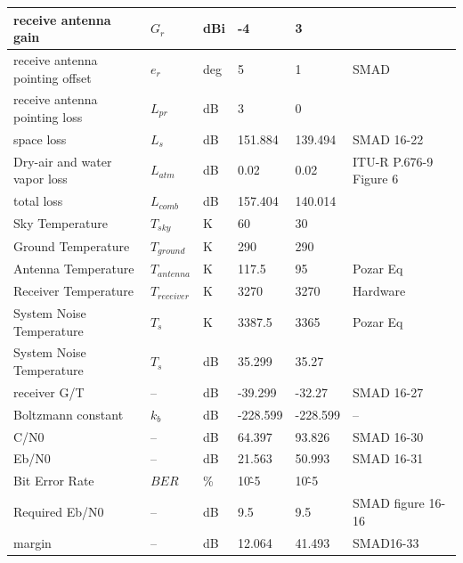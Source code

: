 \documentclass[12pt]{article}
\begin{document}
\begin{center}
\begin{longtable}{| p{3.9cm} | p{1.6cm} | p{1.4cm} | p{1.4cm} | p{1.4cm} | p{5cm} |}
    receive antenna gain & $G_r$  & dBi   & -4    & 3     &  \\\hline
    receive antenna pointing offset & $e_r$  & deg   & 5     & 1     & SMAD \\\hline
    receive antenna pointing loss & $L_{pr}$ & dB    & 3     & 0     &  \\\hline
    space loss & $L_s$  & dB    & 151.884 & 139.494 & SMAD 16-22 \\\hline
    Dry-air and water vapor loss & $L_{atm}$ & dB    & 0.02  & 0.02  & ITU-R P.676-9 Figure 6 \\\hline
    total loss & $L_{comb}$ & dB    & 157.404 & 140.014 &  \\\hline
    Sky Temperature & $T_{sky}$ & K     & 60    & 30    &  \\\hline
    Ground Temperature & $T_{ground}$ & K     & 290   & 290   &  \\\hline
    Antenna Temperature & $T_{antenna}$ & K     & 117.5 & 95    & Pozar Eq \\\hline
    Receiver Temperature & $T_{receiver}$ & K     & 3270  & 3270  & Hardware \\\hline
    System Noise Temperature & $T_s$  & K     & 3387.5 & 3365  & Pozar Eq \\\hline
    System Noise Temperature & $T_s$  & dB    & 35.299 & 35.27 &  \\\hline
    receiver G/T & --    & dB    & -39.299 & -32.27 & SMAD 16-27 \\\hline
    Boltzmann constant & $k_b$  & dB    & -228.599 & -228.599 & -- \\\hline
    C/N0  & --    & dB    & 64.397 & 93.826 & SMAD 16-30 \\\hline
    Eb/N0 & --    & dB    & 21.563 & 50.993 & SMAD 16-31 \\\hline
    Bit Error Rate & $BER$   & \%    & 10\^-5 & 10\^-5 &  \\\hline
    Required Eb/N0 & --    & dB    & 9.5   & 9.5   & SMAD figure 16-16 \\\hline
    margin & --    & dB    & 12.064 & 41.493 & SMAD16-33 \\
\hline
\end{longtable}
\end{center}


\newpage
\end{document}
